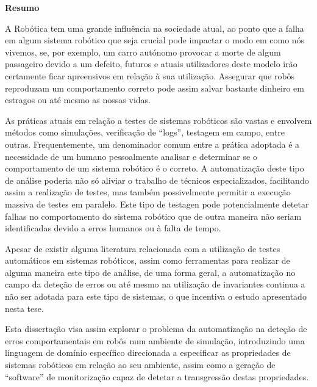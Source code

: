 
\vspace*{2cm}
\begin{center} \Large \bf Resumo
\end{center}
\vspace*{1cm} \setlength{\baselineskip}{0.6cm}

A Robótica tem uma grande influência na sociedade atual, ao ponto que a falha em algum sistema robótico que seja crucial pode impactar o modo em como nós vivemos, se, por exemplo, um carro autónomo provocar a morte de algum passageiro devido a um defeito, futuros e atuais utilizadores deste modelo irão certamente ficar apreensivos em relação à sua utilização. Assegurar que robôs reproduzam um comportamento correto pode assim salvar bastante dinheiro em estragos ou até mesmo as nossas vidas.

As práticas atuais em relação a testes de sistemas robóticos são vastas e envolvem métodos como simulações, verificação de “logs”, testagem em campo, entre outras. Frequentemente, um denominador comum entre a prática adoptada é a necessidade de um humano pessoalmente analisar e determinar se o comportamento de um sistema robótico é o correto. A automatização deste tipo de análise poderia não só aliviar o trabalho de técnicos especializados, facilitando assim a realização de testes, mas também possivelmente permitir a execução massiva de testes em paralelo. Este tipo de testagen pode potencialmente detetar falhas no comportamento do sistema robótico que de outra maneira não seriam identificadas devido a erros humanos ou à falta de tempo.

Apesar de existir alguma literatura relacionada com a utilização de testes automáticos em sistemas robóticos, assim como ferramentas para realizar de alguma maneira este tipo de análise, de uma forma geral, a automatização no campo da deteção de erros ou até mesmo na utilização de invariantes continua a não ser adotada para este tipo de sistemas, o que incentiva o estudo apresentado nesta tese. 

Esta dissertação visa assim explorar o problema da automatização na deteção de erros comportamentais em robôs num ambiente de simulação, introduzindo uma linguagem de domínio específico direcionada a especificar as propriedades de sistemas robóticos em relação ao seu ambiente, assim como a geração de “software” de monitorização capaz de detetar a transgressão destas propriedades.

